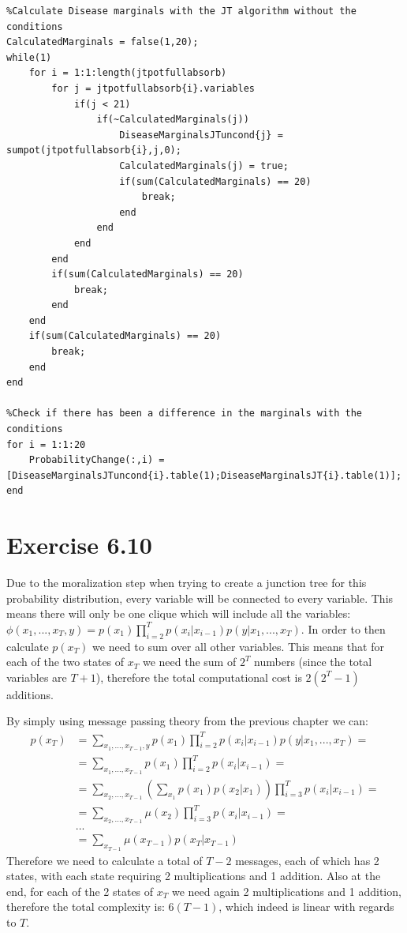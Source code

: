 \documentclass[11pt,a4paper,oneside]{report}
\begin{document}
\begin{lstlisting}
%Calculate Disease marginals with the JT algorithm without the conditions
CalculatedMarginals = false(1,20);
while(1)
    for i = 1:1:length(jtpotfullabsorb)
        for j = jtpotfullabsorb{i}.variables
            if(j < 21)
                if(~CalculatedMarginals(j))
                    DiseaseMarginalsJTuncond{j} = sumpot(jtpotfullabsorb{i},j,0);
                    CalculatedMarginals(j) = true;
                    if(sum(CalculatedMarginals) == 20)
                        break;
                    end
                end
            end
        end
        if(sum(CalculatedMarginals) == 20)
            break;
        end
    end
    if(sum(CalculatedMarginals) == 20)
        break;
    end
end

%Check if there has been a difference in the marginals with the conditions
for i = 1:1:20
    ProbabilityChange(:,i) = [DiseaseMarginalsJTuncond{i}.table(1);DiseaseMarginalsJT{i}.table(1)];
end
\end{lstlisting}

\section*{Exercise 6.10}

Due to the moralization step when trying to create a junction tree for this probability distribution, every variable will be connected to every variable. This means there will only be one clique which will include all the variables: $\phi(x_1,...,x_T,y) = p(x_1)\prod_{i=2}^Tp(x_i|x_{i-1})p(y|x_1,...,x_T)$. In order to then calculate $p(x_T)$ we need to sum over all other variables. This means that for each of the two states of $x_T$ we need the sum of $2^T$ numbers (since the total variables are $T+1$), therefore the total computational cost is $2(2^T-1)$ additions.

By simply using message passing theory from the previous chapter we can:
\begin{align*}
p(x_T)&=\sum_{x_1,...,x_{T-1},y}p(x_1)\prod_{i=2}^Tp(x_i|x_{i-1})p(y|x_1,...,x_T)=\\
&=\sum_{x_1,...,x_{T-1}}p(x_1)\prod_{i=2}^Tp(x_i|x_{i-1})=\\
&=\sum_{x_2,...,x_{T-1}}\left(\sum_{x_1}p(x_1)p(x_2|x_1)\right)\prod_{i=3}^Tp(x_i|x_{i-1})=\\
&=\sum_{x_2,...,x_{T-1}}\mu(x_2)\prod_{i=3}^Tp(x_i|x_{i-1})=\\
&...\\
&=\sum_{x_{T-1}}\mu(x_{T-1})p(x_T|x_{T-1})
\end{align*}
Therefore we need to calculate a total of $T-2$ messages, each of which has 2 states, with each state requiring 2 multiplications and 1 addition. Also at the end, for each of the 2 states of $x_T$ we need again 2 multiplications and 1 addition, therefore the total complexity is: $6(T-1)$, which indeed is linear with regards to $T$.
\end{document}
